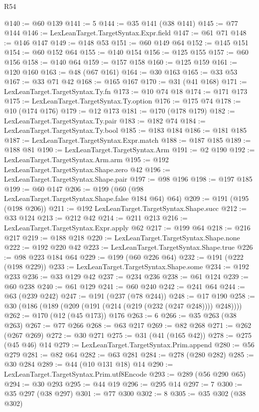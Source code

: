 \begin{lexlean}{R54}
\begin{coremodule}
{{{{{{{{{{{{{{{{{{{{{{{{{{{{{{{{{{{{{{{{{{{{{{{{{{@140 := @60 @139
@141 := 5
@144 := @35 @141 (@38 @141)
@145 := @77 @144
@146 := LexLeanTarget.TargetSyntax.Expr.field
@147 := @61 @71
@148 := @146 @147
@149 := @148 @53
@151 := @60 @149 @64
@152 := @145 @151
@154 := @60 @152 @64
@155 := @140 @154
@156 := @125 @155
@157 := @60 @156
@158 := @140 @64
@159 := @157 @158
@160 := @125 @159
@161 := @120 @160
@163 := @48 (@67 @161)
@164 := @30 @163
@165 := @33 @53
@167 := @33 @71 @42
@168 := @165 @167
@170 := @31 (@41 @168)
@171 := LexLeanTarget.TargetSyntax.Ty.fn
@173 := @10 @74 @18
@174 := @171 @173
@175 := LexLeanTarget.TargetSyntax.Ty.option
@176 := @175 @74
@178 := @10 (@174 @176)
@179 := @12 @173
@181 := @170 (@178 @179)
@182 := LexLeanTarget.TargetSyntax.Ty.pair
@183 := @182 @74
@184 := LexLeanTarget.TargetSyntax.Ty.bool
@185 := @183 @184
@186 := @181 @185
@187 := LexLeanTarget.TargetSyntax.Expr.match
@188 := @187 @185
@189 := @188 @81
@190 := LexLeanTarget.TargetSyntax.Arm
@191 := @2 @190
@192 := LexLeanTarget.TargetSyntax.Arm.arm
@195 := @192 LexLeanTarget.TargetSyntax.Shape.zero @42
@196 := LexLeanTarget.TargetSyntax.Shape.pair
@197 := @98 @196
@198 := @197 @185
@199 := @60 @147
@206 := @199 (@60 (@98 LexLeanTarget.TargetSyntax.Shape.false @184 @64) @64)
@209 := @191 (@195 (@198 @206))
@211 := @192 LexLeanTarget.TargetSyntax.Shape.succ
@212 := @33 @124
@213 := @212 @42
@214 := @211 @213
@216 := LexLeanTarget.TargetSyntax.Expr.apply @62
@217 := @199 @64
@218 := @216 @217
@219 := @188 @218
@220 := LexLeanTarget.TargetSyntax.Shape.none
@222 := @192 @220 @42
@223 := LexLeanTarget.TargetSyntax.Shape.true
@226 := @98 @223 @184 @64
@229 := @199 (@60 @226 @64)
@232 := @191 (@222 (@198 @229))
@233 := LexLeanTarget.TargetSyntax.Shape.some
@234 := @192 @233
@236 := @33 @129 @42
@237 := @234 @236
@238 := @61 @124
@239 := @60 @238
@240 := @61 @129
@241 := @60 @240
@242 := @241 @64
@244 := @63 (@239 @242)
@247 := @191 (@237 (@78 @244))
@248 := @17 @190
@258 := @30 (@186 (@189 (@209 (@191 (@214 (@219 (@232 (@247 @248)))) @248))))
@262 := @170 (@12 (@45 @173)) @176
@263 := 6
@266 := @35 @263 (@38 @263)
@267 := @77 @266
@268 := @63 @217
@269 := @82 @268
@271 := @262 (@267 @269)
@272 := @30 @271
@275 := @31 (@41 (@165 @42))
@278 := @275 (@45 @46) @14
@279 := LexLeanTarget.TargetSyntax.Prim.append
@280 := @56 @279
@281 := @82 @64
@282 := @63 @281
@284 := @278 (@280 @282)
@285 := @30 @284
@289 := @44 (@10 @131 @18) @14
@290 := LexLeanTarget.TargetSyntax.Prim.utf8Encode
@293 := @289 (@56 @290 @65)
@294 := @30 @293
@295 := @44 @19
@296 := @295 @14
@297 := 7
@300 := @35 @297 (@38 @297)
@301 := @77 @300
@302 := 8
@305 := @35 @302 (@38 @302)
}}}}}}}}}}}}}}}}}}}}}}}}}}}}}}}}}}}}}}}}}}}}}}}}}}
\end{coremodule}
\end{lexlean}
